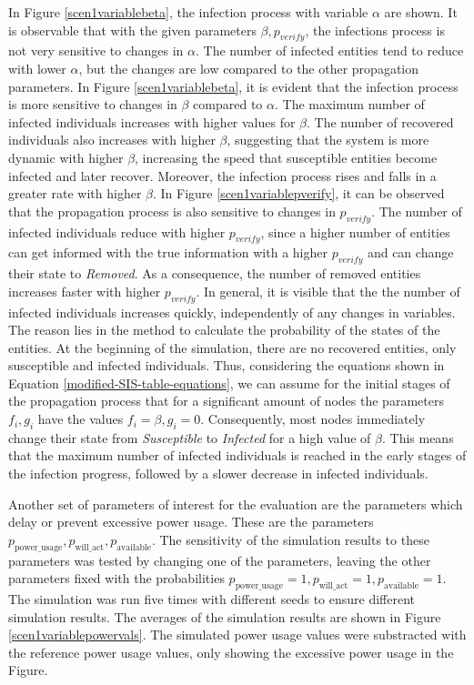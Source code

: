 In Figure \ref{scen1variablebeta}, the infection process with
variable $\alpha$ are shown. It is observable that with the given
parameters $\beta, p_{verify}$, the infections process is
not very sensitive to changes in $\alpha$. The number of infected
entities tend to reduce with lower $\alpha$, but the changes
are low compared to the other propagation parameters.
In Figure \ref{scen1variablebeta}, it is evident that the
infection process is more sensitive to changes in 
$\beta$ compared to $\alpha$. The maximum number of infected 
individuals increases with higher values for $\beta$.
The number of recovered individuals also increases with higher
$\beta$, suggesting that the system is more dynamic with higher 
$\beta$, increasing the speed that susceptible entities
become infected and later recover. Moreover,
the infection process rises and falls in a greater rate with 
higher $\beta$. In Figure \ref{scen1variablepverify},
it can be observed that the propagation process is also 
sensitive to changes in $p_{verify}$. The number of infected 
individuals reduce with higher $p_{verify}$, since a higher
number of entities can get informed with the true information
with a higher $p_{verify}$ and can change their state to 
\textit{Removed}. As a consequence, the number of removed
entities increases faster with higher $p_{verify}$.
In general, it is visible that the the number of infected
individuals increases quickly, independently of any
changes in variables. The reason lies in the method to 
calculate the probability of the states of the entities.
At the beginning of the simulation, there are no recovered
entities, only susceptible and infected individuals.
Thus, considering the equations shown in Equation 
\ref{modified-SIS-table-equations}, we can assume
for the initial stages of the propagation process
that for a significant amount of nodes the 
parameters $f_i, g_i$ have the values 
$f_i=\beta, g_i=0$. Consequently, most nodes immediately 
change their state from \textit{Susceptible} 
to \textit{Infected} for a high value of $\beta$.
This means that the maximum number of infected 
individuals is reached in the early stages of the 
infection progress, followed by a slower decrease
in infected individuals. 


Another set of parameters of interest for the evaluation
are the parameters which delay or prevent excessive
power usage. These are the parameters $p_{\mathrm{power\_usage}},
p_{\mathrm{will\_act}}, p_{\mathrm{available}}$.
The sensitivity of the simulation results to these parameters
was tested by changing one of the parameters, leaving 
the other parameters fixed with the probabilities
$p_{\mathrm{power\_usage}}=1,
p_{\mathrm{will\_act}}=1, p_{\mathrm{available}}=1$.
The simulation was run five times with different seeds 
to ensure different simulation results. The 
averages of the simulation results are shown in 
Figure \ref{scen1variablepowervals}.
The simulated power usage values were substracted with the 
reference power 
usage values, only showing the excessive power usage
in the Figure.

